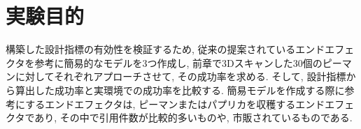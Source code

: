 \section{実験目的}
構築した設計指標の有効性を検証するため, 従来の提案されているエンドエフェクタを参考に簡易的なモデルを3つ作成し, 前章で3Dスキャンした30個のピーマンに対してそれぞれアプローチさせて, その成功率を求める.
そして, 設計指標から算出した成功率と実環境での成功率を比較する.
簡易モデルを作成する際に参考にするエンドエフェクタは, ピーマンまたはパプリカを収穫するエンドエフェクタであり, その中で引用件数が比較的多いものや, 市販されているものである.
